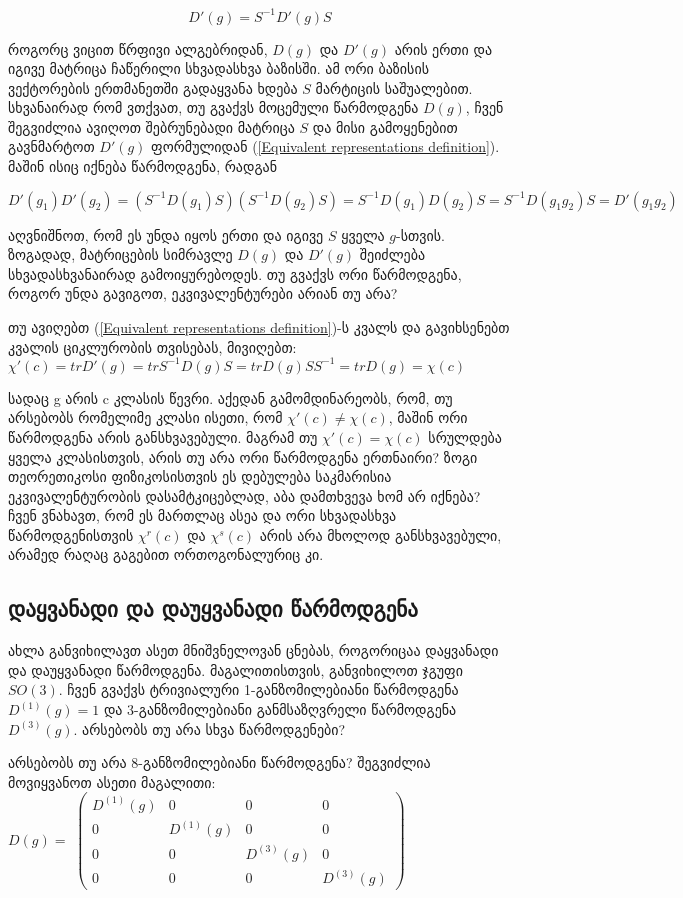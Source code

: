 \documentclass[12pt]{article}
\begin{document}
\begin{sloppypar}
\begin{equation} \label{Equivalent representations definition}
	D'(g) = S^{-1}D'(g)S
\end{equation}

როგორც ვიცით წრფივი ალგებრიდან, $D(g)$ და $D'(g)$ არის ერთი და იგივე მატრიცა ჩაწერილი სხვადასხვა ბაზისში. ამ ორი ბაზისის ვექტორების ერთმანეთში გადაყვანა ხდება $S$ მარტიცის საშუალებით. სხვანაირად რომ ვთქვათ, თუ გვაქვს მოცემული წარმოდგენა $D(g)$, ჩვენ შეგვიძლია ავიღოთ შებრუნებადი მატრიცა $S$ და მისი გამოყენებით გავნმარტოთ $D'(g)$ ფორმულიდან (\ref{Equivalent representations definition}). მაშინ ისიც იქნება წარმოდგენა, რადგან 

$
D'(g_1)D'(g_2) = (S^{-1}D(g_1)S)(S^{-1}D(g_2)S) = S^{-1}D(g_1)D(g_2)S = S^{-1}D(g_1g_2)S = D'(g_1g_2)
$

აღვნიშნოთ, რომ ეს უნდა იყოს ერთი და იგივე $S$ ყველა $g$-სთვის. ზოგადად, მატრიცების სიმრავლე $D(g)$ და $D'(g)$ შეიძლება სხვადასხვანაირად გამოიყურებოდეს. თუ გვაქვს ორი წარმოდგენა, როგორ უნდა გავიგოთ, ეკვივალენტურები არიან თუ არა?

თუ ავიღებთ (\ref{Equivalent representations definition})-ს კვალს და გავიხსენებთ კვალის ციკლურობის თვისებას, მივიღებთ:
$
\chi'(c) = tr D'(g) = tr S^{-1}D(g)S = tr D(g)SS^{-1} = tr D(g) = \chi(c)
$

სადაც g არის c კლასის წევრი. აქედან გამომდინარეობს, რომ, თუ არსებობს რომელიმე კლასი ისეთი, რომ $\chi'(c) \neq \chi(c)$, მაშინ ორი წარმოდგენა არის განსხვავებული. მაგრამ თუ $\chi'(c) = \chi(c)$ სრულდება ყველა კლასისთვის, არის თუ არა ორი წარმოდგენა ერთნაირი? ზოგი თეორეთიკოსი ფიზიკოსისთვის ეს დებულება საკმარისია ეკვივალენტურობის დასამტკიცებლად, აბა დამთხვევა ხომ არ იქნება? ჩვენ ვნახავთ, რომ ეს მართლაც ასეა და ორი სხვადასხვა წარმოდგენისთვის 
$\chi^{r}(c)$ და $\chi^{s}(c)$ არის არა მხოლოდ განსხვავებული, არამედ რაღაც გაგებით ორთოგონალურიც კი.


\subsection{დაყვანადი და დაუყვანადი წარმოდგენა}
ახლა განვიხილავთ ასეთ მნიშვნელოვან ცნებას, როგორიცაა დაყვანადი და დაუყვანადი წარმოდგენა. მაგალითისთვის, განვიხილოთ ჯგუფი $SO(3)$. ჩვენ გვაქვს ტრივიალური 1-განზომილებიანი წარმოდგენა $D^{(1)}(g) = 1 $ და 3-განზომილებიანი განმსაზღვრელი წარმოდგენა $D^{(3)}(g)$. არსებობს თუ არა სხვა წარმოდგენები?

არსებობს თუ არა 8-განზომილებიანი წარმოდგენა? შეგვიძლია მოვიყვანოთ ასეთი მაგალითი: \\
$D(g) = $
$
\begin{pmatrix}
D^{(1)}(g) & 0 & 0 & 0\\
0 & D^{(1)}(g) & 0 & 0\\
0 & 0 & D^{(3)}(g) & 0\\
0 & 0 & 0 & D^{(3)}(g)
\end{pmatrix}
$ \\


\end{sloppypar}
\end{document}
